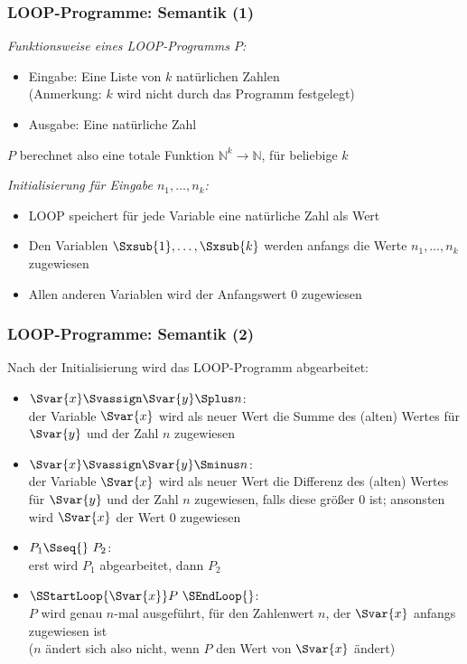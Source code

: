 \documentclass[aspectratio=1610,onlymath]{beamer}
\begin{document}
\begin{frame}\frametitle{LOOP-Programme: Semantik (1)}

\emph{Funktionsweise eines LOOP-Programms $P$:}
\begin{itemize}
\item \alert{Eingabe:} Eine Liste von $k$ natürlichen Zahlen\\
(Anmerkung: $k$ wird nicht durch das Programm festgelegt)
\item \alert{Ausgabe:} Eine natürliche Zahl
\end{itemize}
$P$ berechnet also eine totale Funktion $\mathbb{N}^k\to \mathbb{N}$, für beliebige $k$
\bigskip\pause

\emph{Initialisierung für Eingabe $n_1,\ldots,n_k$:}
\begin{itemize}
\item LOOP speichert für jede Variable eine natürliche Zahl als Wert
\item Den Variablen $\Sxsub{1},\ldots,\Sxsub{k}$ werden anfangs die Werte $n_1,\ldots,n_k$ zugewiesen
\item Allen anderen Variablen wird der Anfangswert $0$ zugewiesen

\end{itemize}

\end{frame}

\begin{frame}\frametitle{LOOP-Programme: Semantik (2)}

Nach der Initialisierung wird das LOOP-Programm abgearbeitet:
\begin{itemize}
\item $\Svar{x} \Svassign \Svar{y} \Splus n$:\\
der Variable $\Svar{x}$ wird als neuer Wert die Summe des (alten) Wertes für $\Svar{y}$ und der Zahl $n$ zugewiesen
\item $\Svar{x} \Svassign \Svar{y} \Sminus n$:\\
der Variable $\Svar{x}$ wird als neuer Wert die Differenz des (alten) Wertes für $\Svar{y}$ und der Zahl $n$ zugewiesen, falls diese größer $0$ ist; ansonsten wird $\Svar{x}$ der Wert $0$ zugewiesen
\item $P_1\Sseq{}~P_2$:\\
erst wird $P_1$ abgearbeitet, dann $P_2$
\item $\SStartLoop{\Svar{x}}P~\SEndLoop{}$:\\
$P$ wird genau $n$-mal ausgeführt, für den Zahlenwert $n$, der $\Svar{x}$ anfangs zugewiesen ist\\
\textcolor{devilscss}{($n$ ändert sich also nicht, wenn $P$ den Wert von $\Svar{x}$ ändert)}
\end{itemize}

\end{frame}
\end{document}
